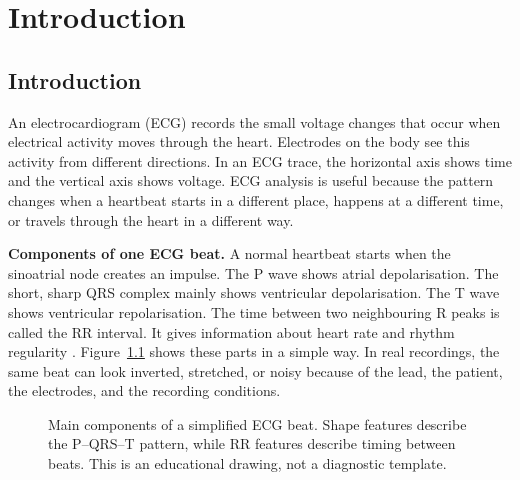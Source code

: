 \chapter{Introduction}\label{ch:introduction}

\section{Introduction}

An electrocardiogram (ECG) records the small voltage changes that occur when
electrical activity moves through the heart. Electrodes on the body see this
activity from different directions. In an ECG trace, the horizontal axis shows
time and the vertical axis shows voltage. ECG analysis is useful because the
pattern changes when a heartbeat starts in a different place, happens at a
different time, or travels through the heart in a different way.

\textbf{Components of one ECG beat.}
A normal heartbeat starts when the sinoatrial node creates an impulse. The
P wave shows atrial depolarisation. The short, sharp QRS complex mainly shows
ventricular depolarisation. The T wave shows ventricular repolarisation. The
time between two neighbouring R peaks is called the RR interval. It gives
information about heart rate and rhythm regularity
\cite{kligfield2007standardization}. Figure~\ref{fig:intro-ecg-anatomy} shows
these parts in a simple way. In real recordings, the same beat can look
inverted, stretched, or noisy because of the lead, the patient, the electrodes,
and the recording conditions.

\begin{figure}[H]
\centering
{}
\caption{Main components of a simplified ECG beat. Shape features describe the
P--QRS--T pattern, while RR features describe timing between beats. This is an
educational drawing, not a diagnostic template.}
\label{fig:intro-ecg-anatomy}
\end{figure}


